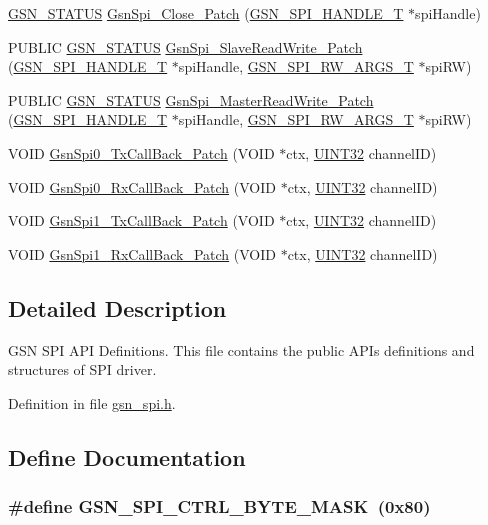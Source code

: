 \begin{DoxyCompactItemize}
\item 
\hyperlink{a00660_gada5951904ac6110b1fa95e51a9ddc217}{GSN\_\-STATUS} \hyperlink{a00587_a9ee88fbbb0adb04ad37cc545aa863bfc}{GsnSpi\_\-Close\_\-Patch} (\hyperlink{a00238}{GSN\_\-SPI\_\-HANDLE\_\-T} $\ast$spiHandle)
\item 
PUBLIC \hyperlink{a00660_gada5951904ac6110b1fa95e51a9ddc217}{GSN\_\-STATUS} \hyperlink{a00587_a4e53ad22ba5ae147b718beea75c4d098}{GsnSpi\_\-SlaveReadWrite\_\-Patch} (\hyperlink{a00238}{GSN\_\-SPI\_\-HANDLE\_\-T} $\ast$spiHandle, \hyperlink{a00239}{GSN\_\-SPI\_\-RW\_\-ARGS\_\-T} $\ast$spiRW)
\item 
PUBLIC \hyperlink{a00660_gada5951904ac6110b1fa95e51a9ddc217}{GSN\_\-STATUS} \hyperlink{a00587_a6b43097fa987f686cdbbaa39882a5e70}{GsnSpi\_\-MasterReadWrite\_\-Patch} (\hyperlink{a00238}{GSN\_\-SPI\_\-HANDLE\_\-T} $\ast$spiHandle, \hyperlink{a00239}{GSN\_\-SPI\_\-RW\_\-ARGS\_\-T} $\ast$spiRW)
\item 
VOID \hyperlink{a00587_a13d0dbc631b15bf6785f92f9a04bd264}{GsnSpi0\_\-TxCallBack\_\-Patch} (VOID $\ast$ctx, \hyperlink{a00660_gae1e6edbbc26d6fbc71a90190d0266018}{UINT32} channelID)
\item 
VOID \hyperlink{a00587_a9c96753aa477c53506e173d5ef6cf7e6}{GsnSpi0\_\-RxCallBack\_\-Patch} (VOID $\ast$ctx, \hyperlink{a00660_gae1e6edbbc26d6fbc71a90190d0266018}{UINT32} channelID)
\item 
VOID \hyperlink{a00587_a6dea914c8be26f943338ddfbf83e3aa5}{GsnSpi1\_\-TxCallBack\_\-Patch} (VOID $\ast$ctx, \hyperlink{a00660_gae1e6edbbc26d6fbc71a90190d0266018}{UINT32} channelID)
\item 
VOID \hyperlink{a00587_a994713a1125a0a17d390664881115924}{GsnSpi1\_\-RxCallBack\_\-Patch} (VOID $\ast$ctx, \hyperlink{a00660_gae1e6edbbc26d6fbc71a90190d0266018}{UINT32} channelID)
\end{DoxyCompactItemize}


\subsection{Detailed Description}
GSN SPI API Definitions. This file contains the public APIs definitions and structures of SPI driver. 

Definition in file \hyperlink{a00587_source}{gsn\_\-spi.h}.



\subsection{Define Documentation}
\hypertarget{a00587_a361e1e9747279106b4a35abc82b77de3}{
\subsubsection[{GSN\_\-SPI\_\-CTRL\_\-BYTE\_\-MASK}]{\setlength{\rightskip}{0pt plus 5cm}\#define GSN\_\-SPI\_\-CTRL\_\-BYTE\_\-MASK~(0x80)}}
\label{a00587_a361e1e9747279106b4a35abc82b77de3}


